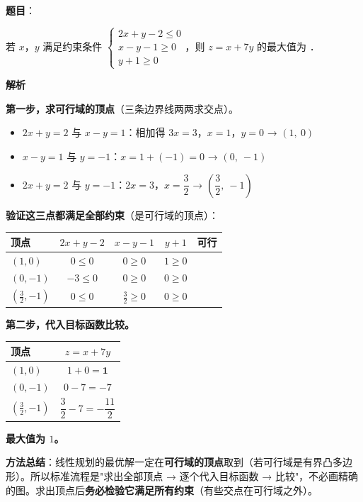 \begin{answer}

\textbf{题目}：

若 $x$，$y$ 满足约束条件 $\begin{cases}2x+y-2\le0\\ x-y-1\ge0\\ y+1\ge0\end{cases}$，则 $z=x+7y$ 的最大值为 \gkblank{}．

\textbf{解析}

\textbf{第一步，求可行域的顶点}（三条边界线两两求交点）。

\begin{itemize}
\item $2x+y=2$ 与 $x-y=1$：相加得 $3x=3$，$x=1$，$y=0$ → $(1,\ 0)$
\item $x-y=1$ 与 $y=-1$：$x=1+(-1)=0$ → $(0,\ -1)$
\item $2x+y=2$ 与 $y=-1$：$2x=3$，$x=\dfrac32$ → $\left(\dfrac32,\ -1\right)$
\end{itemize}

\textbf{验证这三点都满足全部约束}（是可行域的顶点）：

\begin{center}
\begin{tabular}{lcccc}
\toprule
顶点 & $2x+y-2$ & $x-y-1$ & $y+1$ & 可行 \\
\midrule
$(1,0)$ & $0\le0$  & $0\ge0$  & $1\ge0$  &  \\
$(0,-1)$ & $-3\le0$  & $0\ge0$  & $0\ge0$  &  \\
$\left(\frac32,-1\right)$ & $0\le0$  & $\frac32\ge0$  & $0\ge0$  &  \\
\bottomrule
\end{tabular}
\end{center}

\textbf{第二步，代入目标函数比较。}

\begin{center}
\begin{tabular}{lc}
\toprule
顶点 & $z=x+7y$ \\
\midrule
$(1,0)$ & $1+0=\mathbf 1$ \\
$(0,-1)$ & $0-7=-7$ \\
$\left(\frac32,-1\right)$ & $\dfrac32-7=-\dfrac{11}2$ \\
\bottomrule
\end{tabular}
\end{center}

\textbf{最大值为 $1$。}

\begin{gktip}
\textbf{方法总结}：线性规划的最优解一定在\textbf{可行域的顶点}取到（若可行域是有界凸多边形）。所以标准流程是"求出全部顶点 → 逐个代入目标函数 → 比较"，不必画精确的图。求出顶点后\textbf{务必检验它满足所有约束}（有些交点在可行域之外）。
\end{gktip}


\par\medskip

\end{answer}

